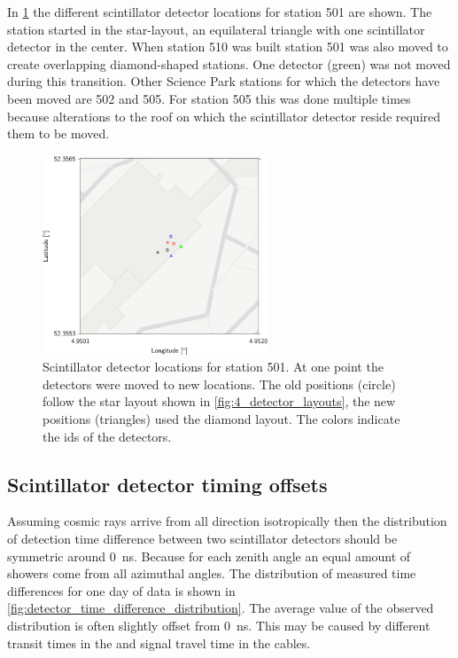 In \cref{fig:4d_station_501_detectors} the different scintillator detector locations for station 501 are shown. The station started in the star-layout, an equilateral triangle with one scintillator detector in the center. When station 510 was built station 501 was also moved to create overlapping diamond-shaped stations. One detector (green) was not moved during this transition. Other Science Park stations for which the detectors have been moved are 502 and 505. For station 505 this was done multiple times because alterations to the roof on which the scintillator detector reside required them to be moved.

\begin{figure}
    \centering
    \includegraphics[width=0.6\textwidth]
                    {plots/station/4d_station_501_detectors}
    \caption{Scintillator detector locations for station 501. At one point the detectors were moved to new locations. The old positions (circle) follow the star layout shown in \cref{fig:4_detector_layouts}, the new positions (triangles) used the diamond layout. The colors indicate the ids of the detectors.}
    \label{fig:4d_station_501_detectors}
\end{figure}


\subsection{Scintillator detector timing offsets}
\label{sec:detector-offsets}

Assuming cosmic rays arrive from all direction isotropically then the distribution of detection time difference between two scintillator detectors should be symmetric around \SI{0}{\ns}. Because for each zenith angle an equal amount of showers come from all azimuthal angles. The distribution of measured time differences for one day of data is shown in \cref{fig:detector_time_difference_distribution}. The average value of the observed distribution is often slightly offset from \SI{0}{\ns}. This may be caused by different transit times in the \pmt and signal travel time in the cables.

